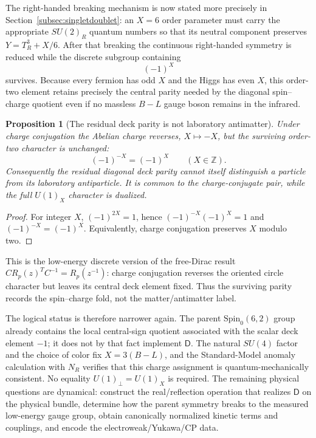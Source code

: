 \documentclass[11pt]{article}
\newtheorem{proposition}[theorem]{Proposition}
\theoremstyle{definition}\newtheorem{definition}[theorem]{Definition}
\theoremstyle{remark}\newtheorem{remark}[theorem]{Remark}\newtheorem{conjecture}[theorem]{Conjecture}
\begin{document}
The right-handed breaking mechanism is now stated more precisely in Section~\ref{subsec:singletdoublet}: an $X=6$ order parameter must carry the appropriate $SU(2)_R$ quantum numbers so that its neutral component preserves $Y=T^3_R+X/6$. After that breaking the continuous right-handed symmetry is reduced while the discrete subgroup containing
\begin{equation}\label{eq:matterparity}
 \boxed{(-1)^X}
\end{equation}
survives. Because every fermion has odd $X$ and the Higgs has even $X$, this order-two element retains precisely the central parity needed by the diagonal spin--charge quotient even if no massless $B-L$ gauge boson remains in the infrared.

\begin{proposition}[The residual deck parity is not laboratory antimatter]\label{prop:XCeven}
Under charge conjugation the Abelian charge reverses, $X\mapsto-X$, but the surviving order-two character is unchanged:
\begin{equation}
 \boxed{(-1)^{-X}=(-1)^X}\qquad (X\in\mathbb Z).
\end{equation}
Consequently the residual diagonal deck parity cannot itself distinguish a particle from its laboratory antiparticle. It is common to the charge-conjugate pair, while the full $U(1)_X$ character is dualized.
\end{proposition}
\begin{proof}
For integer $X$, $(-1)^{2X}=1$, hence $(-1)^{-X}(-1)^X=1$ and $(-1)^{-X}=(-1)^X$. Equivalently, charge conjugation preserves $X$ modulo two.
\end{proof}
This is the low-energy discrete version of the free-Dirac result $C R_p(z)^T C^{-1}=R_p(z^{-1})$: charge conjugation reverses the oriented circle character but leaves its central deck element fixed. Thus the surviving parity records the spin--charge fold, not the matter/antimatter label.

The logical status is therefore narrower again. The parent $\mathrm{Spin}_0(6,2)$ group already contains the local central-sign quotient associated with the scalar deck element $-1$; it does not by that fact implement $\mathsf D$. The natural $SU(4)$ factor and the choice of color fix $X=3(B-L)$, and the Standard-Model anomaly calculation with $N_R$ verifies that this charge assignment is quantum-mechanically consistent. No equality $U(1)_\perp=U(1)_X$ is required. The remaining physical questions are dynamical: construct the real/reflection operation that realizes $\mathsf D$ on the physical bundle, determine how the parent symmetry breaks to the measured low-energy gauge group, obtain canonically normalized kinetic terms and couplings, and encode the electroweak/Yukawa/CP data.
\end{document}
